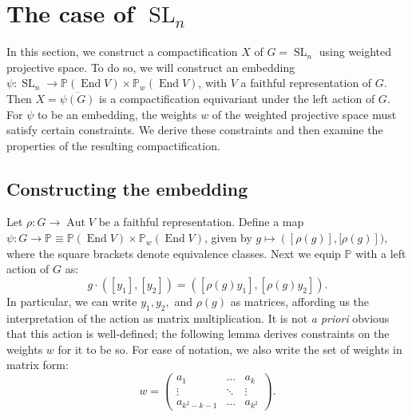 \documentclass{amsart}
\newcommand{\Proj}{\mathbb{P}}
\DeclareMathOperator{\Aut}{Aut}
\DeclareMathOperator{\End}{End}
\DeclareMathOperator{\SL}{SL}
\theoremstyle{definition}
\theoremstyle{remark}
\numberwithin{equation}{section}
\begin{document}


\section{The case of $\SL_n$}

In this section, we construct a compactification $X$ of $G=\SL_n$ using weighted projective space. To do so, we will construct an embedding $\psi: \SL_n \to \Proj(\End V) \times \Proj_w(\End V)$, with $V$ a faithful representation of $G$. Then $X = \overline{\psi(G)}$ is a compactification equivariant under the left action of $G$. For $\psi$ to be an embedding, the weights $w$ of the weighted projective space must satisfy certain constraints. We derive these constraints and then examine the properties of the resulting compactification. 


\subsection{Constructing the embedding}
Let $\rho: G\to \Aut V$ be a faithful representation. Define a map $\psi: G \to \Proj\equiv\Proj(\End V) \times \Proj_{w}(\End V)$, given by
$g \mapsto  \left([\rho(g)], [\rho(g)\right])$, where the square brackets denote equivalence classes.
Next we equip $\Proj$ with a left action of $G$ as:
\begin{equation}
    g\cdot ([y_1],[y_2])=([\rho(g)y_1],[\rho(g)y_2]).
    \label{eq:leftGaction}
\end{equation}
In particular, we can write $y_1,y_2,$ and $\rho(g)$ as matrices, affording us the interpretation of the action as matrix multiplication.
It is not \textit{a priori} obvious that this action is well-defined; the following lemma derives constraints on the weights $w$ for it to be so.
For ease of notation, we also write the set of weights in matrix form:
\[w = \left( \begin{array}{ccc} 
a_1 & \hdots & a_k  \\
\vdots & \ddots & \vdots \\
a_{k^2-k-1} & \hdots & a_{k^2} \end{array} \right).\]
\end{document}

